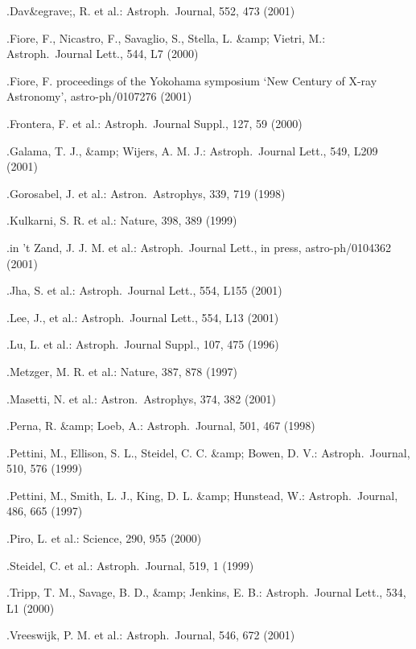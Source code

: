 {{{{{{{{{{{{{{%

\bibitem
.Dav&egrave;, R. et al.: Astroph.\ Journal, 552, 473 (2001)

\bibitem
.Fiore, F., Nicastro, F., Savaglio, S., Stella, L. &amp; Vietri, M.:
Astroph.\ Journal Lett., 544, L7 (2000)

\bibitem
.Fiore, F. proceedings of the Yokohama symposium
`New Century of X-ray Astronomy', astro-ph/0107276 (2001)

\bibitem
.Frontera, F. et al.: Astroph.\ Journal Suppl., 127, 59 (2000)

\bibitem
.Galama, T. J., &amp; Wijers, A. M. J.: Astroph.\ Journal Lett., 549, L209
(2001)

\bibitem
.Gorosabel, J. et al.:  Astron.\ Astrophys, 339, 719 (1998)

\bibitem
.Kulkarni, S. R. et al.: Nature, 398, 389 (1999)

\bibitem
.in 't Zand, J. J. M. et al.: Astroph.\ Journal Lett., in press, astro-ph/0104362 (2001)

\bibitem
.Jha, S. et al.: Astroph.\ Journal Lett., 554, L155 (2001)

\bibitem
.Lee, J., et al.: Astroph.\ Journal Lett., 554, L13 (2001)

\bibitem
.Lu, L. et al.: Astroph.\ Journal Suppl., 107, 475 (1996)

\bibitem
.Metzger, M. R. et al.: Nature, 387, 878 (1997)

\bibitem
.Masetti, N. et al.: Astron.\ Astrophys, 374, 382 (2001)

\bibitem
.Perna, R. &amp; Loeb, A.: Astroph.\ Journal, 501, 467 (1998)

\bibitem
.Pettini, M., Ellison, S. L., Steidel, C. C. &amp; Bowen, D. V.:
Astroph.\ Journal,  510, 576 (1999)

\bibitem
.Pettini, M., Smith, L. J., King, D. L. &amp; Hunstead, W.:
Astroph.\ Journal, 486, 665 (1997)

\bibitem
.Piro, L. et al.: Science, 290, 955 (2000)


\bibitem
.Steidel, C. et al.: Astroph.\ Journal, 519, 1 (1999)

\bibitem
.Tripp, T. M., Savage, B. D., &amp; Jenkins, E. B.: Astroph.\ Journal Lett.,
534, L1 (2000)

\bibitem
.Vreeswijk, P. M. et al.: Astroph.\ Journal, 546, 672 (2001)




}}}}}}}}}}}}}}
